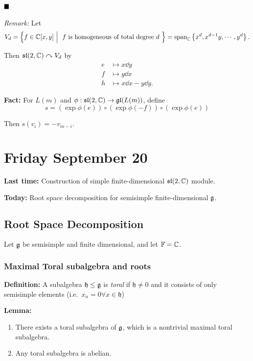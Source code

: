 \(\qed\)

\emph{Remark:} Let \[
V_d = \left\{{f\in{\mathbb{C}}[x,y] {~\mathrel{\Big|}~} \text{ $f$ is homogeneous of total degree $d$ }}\right\} = \mathrm{span}_{\mathbb{C}}\left\{{x^d, x^{d-1}y, \cdots, y^d}\right\}
.\]

Then \({\mathfrak{sl}}(2, {\mathbb{C}})\curvearrowright V_d\) by \begin{align*}
e &\mapsto x \dd{}{y} \\
f &\mapsto y \dd{}{x} \\
h &\mapsto x\dd{}{x} - y\dd{}{y}
.\end{align*}

\textbf{Fact:} For \(L(m)\) and
\(\phi: {\mathfrak{sl}}(2, {\mathbb{C}}) \to {\mathfrak{gl}}(L(m))\), define \[
s = (\exp \phi(e)) \circ (\exp \phi(-f)) \circ (\exp \phi(e))
\]

Then \(s(v_i) = -v_{m-i}\).

\hypertarget{friday-september-20}{%
\section{Friday September 20}\label{friday-september-20}}

\textbf{Last time:} Construction of simple finite-dimensional
\({\mathfrak{sl}}(2, {\mathbb{C}})\) module.

\textbf{Today:} Root space decomposition for semisimple
finite-dimensional \({\mathfrak{g}}\).

\hypertarget{root-space-decomposition}{%
\subsection{Root Space Decomposition}\label{root-space-decomposition}}

Let \({\mathfrak{g}}\) be semisimple and finite dimensional, and let
\({\mathbb{F}} = {\mathbb{C}}\).

\hypertarget{maximal-toral-subalgebra-and-roots}{%
\subsubsection{Maximal Toral subalgebra and
roots}\label{maximal-toral-subalgebra-and-roots}}

\textbf{Definition:} A subalgebra \(\mathfrak{h} \leq {\mathfrak{g}}\) is
\emph{toral} if \(\mathfrak{h} \neq 0\) and it consists of only
semisimple elements (i.e.~\(x_n = 0 \forall x\in \mathfrak{h}\))

\textbf{Lemma:}

\begin{enumerate}
\def\labelenumi{\alph{enumi}.}
\tightlist
\item
  There exists a toral subalgebra of \({\mathfrak{g}}\), which is a nontrivial
  maximal toral subalgebra.
\item
  Any toral subalgebra is abelian.
\end{enumerate}

